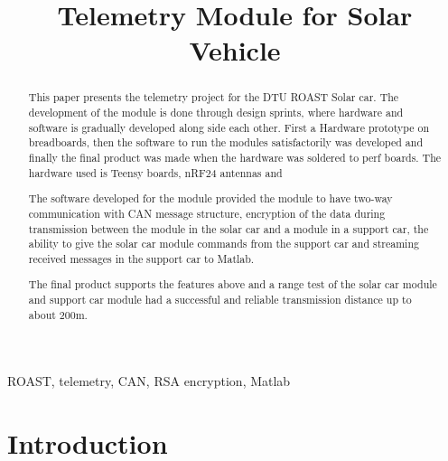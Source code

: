 \documentclass[conference]{IEEEtran}
\begin{document}
\title{Telemetry Module for Solar Vehicle}

\author{
}

\maketitle

\begin{abstract}
This paper presents the telemetry project for the DTU ROAST Solar car. The development of the module is done through design sprints, where hardware and software is gradually developed along side each other. First a Hardware prototype on breadboards, then the software to run the modules satisfactorily was developed and finally the final product was made when the hardware was soldered to perf boards. The hardware used is Teensy boards, nRF24 antennas and 

The software developed for the module provided the module to have two-way communication with CAN message structure, encryption of the data during transmission between the module in the solar car and a module in a support car, the ability to give the solar car module commands from the support car and streaming received messages in the support car to Matlab.

The final product supports the features above and a range test of the solar car module and support car module had a successful and reliable transmission distance up to about 200m.
\end{abstract}

\begin{IEEEkeywords}
ROAST, telemetry, CAN, RSA encryption, Matlab
\end{IEEEkeywords}



\section{Introduction}
\end{document}
